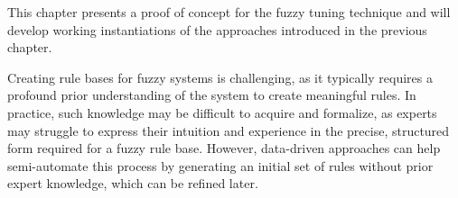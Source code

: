 \newcommand{\crispTreeNode}[2]{
    \begin{tikzpicture}
        \begin{axis}%
            [
                title = {Crisp Split: $#1 \leq #2$},
                width=4.5cm,
                height=3cm,
                axis lines=center,
                xlabel={#1},
                x label style={at={(axis description cs:0.9,-0.1)},anchor=north},
                ylabel=$\mu$,
                y label style={at={(axis description cs:0.5,1)},anchor=south},
                xmin=-5,
                xmax=5,
                xtick={},
                xticklabels= {},
                ytick={},
                yticklabels={},
                extra x ticks={0},
                extra x tick labels={#2},
                ymin=-0.1,
                ymax=1.1,
                samples=50,
                extra y ticks={1},
                every axis plot/.append style={thick}
            ]
            \addplot[red,domain=-5:-0.6] {step(x,0,-1)};
            \addplot[blue,domain=0.6:5] {step(x,0,1)};
            \addplot[red,domain=0.6:5] {step(x,0,-1)};
            \addplot[blue,domain=-5:-0.6] {step(x,0,1)};

            \node[draw,draw=black,circle,inner sep=1pt,minimum width=3pt,thick] at (axis cs:0,1) {};
            \node[draw,draw=black,circle,inner sep=1pt,minimum width=3pt,thick] at (axis cs:0,0) {};

            \node[anchor=center, red] at (axis cs:-2.9,0.6) {$#1 \leq #2$};
            \node[anchor=center, blue] at (axis cs:3.1,0.6) {$#1 > #2$};
        \end{axis}

    \end{tikzpicture}
}



This chapter presents a proof of concept for the fuzzy tuning technique and will develop working instantiations of the approaches introduced in the previous chapter.

\smallskip

\noindent Creating rule bases for fuzzy systems is challenging, as it typically requires a profound prior understanding of the system to create meaningful rules. In practice, such knowledge may be difficult to acquire and formalize, as experts may struggle to express their intuition and experience in the precise, structured form required for a fuzzy rule base. However, data-driven approaches can help semi-automate this process by generating an initial set of rules without prior expert knowledge, which can be refined later.

